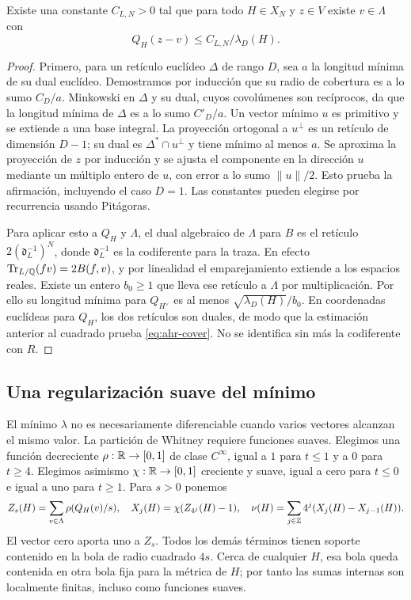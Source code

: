 \begin{lema}
\label{lem:ahr-trans}
Existe una constante $C_{L,N}>0$ tal que para todo $H\in X_N$ y $z\in V$ existe $v\in\Lambda$ con
\begin{equation}
 Q_H(z-v)\le C_{L,N}/\lambda_D(H).
 \label{eq:ahr-cover}
\end{equation}
\end{lema}
\begin{proof}
Primero, para un retículo euclídeo $\Delta$ de rango $D$, sea $a$ la longitud mínima de su dual euclídeo. Demostramos por inducción que su radio de cobertura es a lo sumo $C_D/a$. Minkowski en $\Delta$ y su dual, cuyos covolúmenes son recíprocos, da que la longitud mínima de $\Delta$ es a lo sumo $C'_D/a$. Un vector mínimo $u$ es primitivo y se extiende a una base integral. La proyección ortogonal a $u^\perp$ es un retículo de dimensión $D-1$; su dual es $\Delta^*\cap u^\perp$ y tiene mínimo al menos $a$. Se aproxima la proyección de $z$ por inducción y se ajusta el componente en la dirección $u$ mediante un múltiplo entero de $u$, con error a lo sumo $\|u\|/2$. Esto prueba la afirmación, incluyendo el caso $D=1$. Las constantes pueden elegirse por recurrencia usando Pitágoras.

Para aplicar esto a $Q_H$ y $\Lambda$, el dual algebraico de $\Lambda$ para $B$ es el retículo $2(\mathfrak d_L^{-1})^N$, donde $\mathfrak d_L^{-1}$ es la codiferente para la traza. En efecto $\operatorname{Tr}_{L/\mathbb{Q}}(fv)=2B(f,v)$, y por linealidad el emparejamiento extiende a los espacios reales. Existe un entero $b_0\ge1$ que lleva ese retículo a $\Lambda$ por multiplicación. Por ello su longitud mínima para $Q_{H^\vee}$ es al menos $\sqrt{\lambda_D(H)}/b_0$. En coordenadas euclídeas para $Q_H$, los dos retículos son duales, de modo que la estimación anterior al cuadrado prueba \eqref{eq:ahr-cover}. No se identifica sin más la codiferente con $R$.
\end{proof}

\subsection{Una regularización suave del mínimo}

El mínimo $\lambda$ no es necesariamente diferenciable cuando varios vectores alcanzan el mismo valor. La partición de Whitney requiere funciones suaves. Elegimos una función decreciente $\rho:\mathbb{R}\to[0,1]$ de clase $C^\infty$, igual a $1$ para $t\le1$ y a $0$ para $t\ge4$. Elegimos asimismo $\chi:\mathbb{R}\to[0,1]$ creciente y suave, igual a cero para $t\le0$ e igual a uno para $t\ge1$. Para $s>0$ ponemos
\begin{equation}
 Z_s(H)=\sum_{v\in\Lambda}\rho(Q_H(v)/s),\quad
 X_j(H)=\chi(Z_{4^j}(H)-1),\quad
 \nu(H)=\sum_{j\in\mathbb{Z}}4^j(X_j(H)-X_{j-1}(H)).
 \label{eq:ahr-smooth}
\end{equation}
El vector cero aporta uno a $Z_s$. Todos los demás términos tienen soporte contenido en la bola de radio cuadrado $4s$. Cerca de cualquier $H$, esa bola queda contenida en otra bola fija para la métrica de $H$; por tanto las sumas internas son localmente finitas, incluso como funciones suaves.

